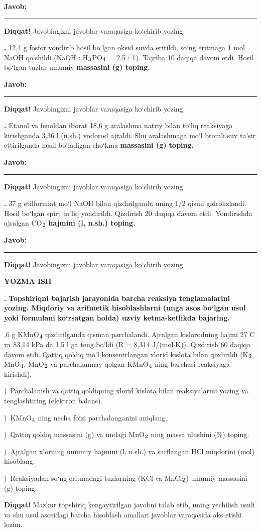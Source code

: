 \documentclass[11pt,a4paper]{article}
\renewcommand{\textsubscript}[1]{\ensuremath{_{\text{\fontsize{8}{8}\selectfont #1}}}}
\newcommand{\qn}[1]{\textbf{\fontsize{11.5}{13}\selectfont #1}}
\newcommand{\qsep}{\par\vspace{13pt}}
\newcommand{\diqqat}[1]{\par\smallskip\noindent\textbf{Diqqat!} #1\par\medskip}
\newcommand{\javob}{\par\nopagebreak[4]\smallskip\noindent\textbf{Javob:} \rule[-2pt]{7.5cm}{0.4pt}\par\smallskip\noindent\textbf{Diqqat!} Javobingizni javoblar varaqasiga ko`chirib yozing.\par\medskip}
\begin{document}
\javob\qsep
\noindent\qn{38.} 12,4 g fosfor yondirib hosil bo`lgan oksid suvda eritildi, so`ng eritmaga 1 mol NaOH qo`shildi (NaOH : H\textsubscript{3}PO\textsubscript{4} = 2,5 : 1). Tajriba 10 daqiqa davom etdi. Hosil bo`lgan tuzlar umumiy \textbf{massasini (g) toping.}
\javob\qsep
\noindent\qn{39.} Etanol va fenoldan iborat 18,6 g aralashma natriy bilan to`liq reaksiyaga kirishganda 3,36 l (n.sh.) vodorod ajraldi. Shu aralashmaga mo`l bromli suv ta'sir ettirilganda hosil bo`ladigan cho`kma \textbf{massasini (g) toping.}
\javob\qsep
\noindent\qn{40.} 37 g etilformiat mo`l NaOH bilan qizdirilganda uning 1/2 qismi gidrolizlandi. Hosil bo`lgan spirt to`liq yondirildi. Qizdirish 20 daqiqa davom etdi. Yondirishda ajralgan CO\textsubscript{2} \textbf{hajmini (l, n.sh.) toping.}
\javob\qsep
\par\bigskip\begin{center}\textbf{\fontsize{13}{15}\selectfont YOZMA ISH}\end{center}
\noindent\qn{41.} \textbf{Topshiriqni bajarish jarayonida barcha reaksiya tenglamalarini yozing. Miqdoriy va arifmetik hisoblashlarni (unga asos bo`lgan usul yoki formulani ko`rsatgan holda) uzviy ketma-ketlikda bajaring.}\par{},6 g KMnO\textsubscript{4} qizdirilganda qisman parchalandi. Ajralgan kislorodning hajmi 27 \textdegree{}C va 83,14 kPa da 1,5 l ga teng bo`ldi (R = 8,314 J/(mol$\cdot$K)). Qizdirish 60 daqiqa davom etdi. Qattiq qoldiq mo`l konsentrlangan xlorid kislota bilan qizdirildi (K\textsubscript{2}MnO\textsubscript{4}, MnO\textsubscript{2} va parchalanmay qolgan KMnO\textsubscript{4} ning barchasi reaksiyaga kirishdi).\par
{})\ Parchalanish va qattiq qoldiqning xlorid kislota bilan reaksiyalarini yozing va tenglashtiring (elektron balans).\par
{})\ KMnO\textsubscript{4} ning necha foizi parchalanganini aniqlang.\par
{})\ Qattiq qoldiq massasini (g) va undagi MnO\textsubscript{2} ning massa ulushini (\%) toping.\par
{})\ Ajralgan xlorning umumiy hajmini (l, n.sh.) va sarflangan HCl miqdorini (mol) hisoblang.\par
{})\ Reaksiyadan so`ng eritmadagi tuzlarning (KCl va MnCl\textsubscript{2}) umumiy massasini (g) toping.\par
\diqqat{Mazkur topshiriq kengaytirilgan javobni talab etib, uning yechilish usuli va shu usul asosidagi barcha hisoblash amallari javoblar varaqasida aks etishi lozim.}\qsep
\end{document}
